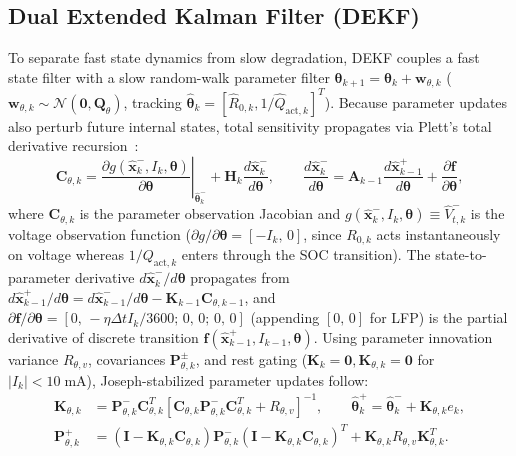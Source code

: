 \documentclass[10pt,a4paper]{article}
\begin{document}
\subsection{Dual Extended Kalman Filter (DEKF)}
To separate fast state dynamics from slow degradation, DEKF couples a fast state filter with a slow random-walk parameter filter $\boldsymbol{\theta}_{k+1} = \boldsymbol{\theta}_k + \mathbf{w}_{\theta,k}$ ($\mathbf{w}_{\theta,k} \sim \mathcal{N}(\mathbf{0}, \mathbf{Q}_\theta)$, tracking $\hat{\boldsymbol{\theta}}_k = [\hat{R}_{0,k}, 1/\hat{Q}_{\text{act},k}]^T$). Because parameter updates also perturb future internal states, total sensitivity propagates via Plett's total derivative recursion~\cite{Plett2004part3}:
\begin{equation}\label{eqn:dekf_param_jacobian}
\mathbf{C}_{\theta,k} = \left.\frac{\partial g(\hat{\mathbf{x}}_k^-, I_k, \boldsymbol{\theta})}{\partial \boldsymbol{\theta}}\right|_{\hat{\boldsymbol{\theta}}_k^-} + \mathbf{H}_k \frac{d\hat{\mathbf{x}}_k^-}{d\boldsymbol{\theta}}, \qquad
\frac{d\hat{\mathbf{x}}_k^-}{d\boldsymbol{\theta}} = \mathbf{A}_{k-1} \frac{d\hat{\mathbf{x}}_{k-1}^+}{d\boldsymbol{\theta}} + \frac{\partial \mathbf{f}}{\partial \boldsymbol{\theta}},
\end{equation}
where $\mathbf{C}_{\theta,k}$ is the parameter observation Jacobian and $g(\hat{\mathbf{x}}_k^-, I_k, \boldsymbol{\theta}) \equiv \hat{V}_{t,k}^-$ is the voltage observation function ($\partial g/\partial\boldsymbol{\theta} = [-I_k,\, 0]$, since $R_{0,k}$ acts instantaneously on voltage whereas $1/Q_{\text{act},k}$ enters through the SOC transition). The state-to-parameter derivative $d\hat{\mathbf{x}}_k^-/d\boldsymbol{\theta}$ propagates from $d\hat{\mathbf{x}}_{k-1}^+/d\boldsymbol{\theta} = d\hat{\mathbf{x}}_{k-1}^-/d\boldsymbol{\theta} - \mathbf{K}_{k-1}\mathbf{C}_{\theta,k-1}$, and $\partial \mathbf{f}/\partial \boldsymbol{\theta} = [0,\, -\eta\Delta t I_k/3600;\, 0,\, 0;\, 0,\, 0]$ (appending $[0,\, 0]$ for LFP) is the partial derivative of discrete transition $\mathbf{f}(\hat{\mathbf{x}}_{k-1}^+, I_{k-1}, \boldsymbol{\theta})$. Using parameter innovation variance $R_{\theta,v}$, covariances $\mathbf{P}_{\theta,k}^\pm$, and rest gating ($\mathbf{K}_k = \mathbf{0}, \mathbf{K}_{\theta,k} = \mathbf{0}$ for $|I_k| < 10\;\mathrm{mA}$), Joseph-stabilized parameter updates follow:
\begin{align}\label{eqn:dekf_param_cov}
\mathbf{K}_{\theta,k} &= \mathbf{P}_{\theta,k}^- \mathbf{C}_{\theta,k}^T [ \mathbf{C}_{\theta,k} \mathbf{P}_{\theta,k}^- \mathbf{C}_{\theta,k}^T + R_{\theta,v} ]^{-1}, \qquad
\hat{\boldsymbol{\theta}}_k^+ = \hat{\boldsymbol{\theta}}_k^- + \mathbf{K}_{\theta,k} e_k, \nonumber\\
\mathbf{P}_{\theta,k}^+ &= (\mathbf{I} - \mathbf{K}_{\theta,k} \mathbf{C}_{\theta,k}) \mathbf{P}_{\theta,k}^- (\mathbf{I} - \mathbf{K}_{\theta,k} \mathbf{C}_{\theta,k})^T + \mathbf{K}_{\theta,k} R_{\theta,v} \mathbf{K}_{\theta,k}^T.
\end{align}
\end{document}
